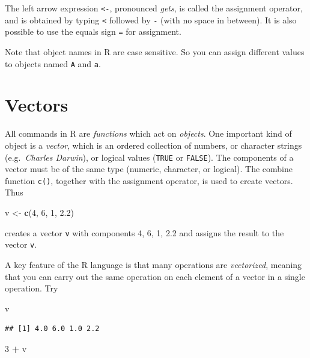 \documentclass[
]{book}
\newenvironment{Shaded}{\begin{snugshade}}{\end{snugshade}}
\newcommand{\DecValTok}[1]{\textcolor[rgb]{0.00,0.00,0.81}{#1}}
\newcommand{\FloatTok}[1]{\textcolor[rgb]{0.00,0.00,0.81}{#1}}
\newcommand{\FunctionTok}[1]{\textcolor[rgb]{0.13,0.29,0.53}{\textbf{#1}}}
\newcommand{\NormalTok}[1]{#1}
\newcommand{\OtherTok}[1]{\textcolor[rgb]{0.56,0.35,0.01}{#1}}
\newcommand{\SpecialCharTok}[1]{\textcolor[rgb]{0.81,0.36,0.00}{\textbf{#1}}}
\begin{document}
The left arrow expression \texttt{\textless{}-}, pronounced \emph{gets}, is called
the assignment operator, and is obtained by typing \texttt{\textless{}} followed
by \texttt{-} (with no space in between). It is also possible to use
the equals sign \texttt{=} for assignment.

Note that object names in R are case sensitive. So you can assign
different values to objects named \texttt{A} and \texttt{a}.

\section{Vectors}\label{vectors}

All commands in R are \emph{functions} which act on \emph{objects}. One
important kind of object is a \emph{vector}, which is an ordered
collection of numbers, or character strings (e.g.~\emph{Charles Darwin}),
or logical values (\texttt{TRUE} or \texttt{FALSE}). The components of a
vector must be of the same type (numeric, character, or logical). The
combine function \texttt{c()}, together with the assignment operator, is
used to create vectors. Thus

\begin{Shaded}
\begin{Highlighting}[]
\NormalTok{v }\OtherTok{\textless{}{-}} \FunctionTok{c}\NormalTok{(}\DecValTok{4}\NormalTok{, }\DecValTok{6}\NormalTok{, }\DecValTok{1}\NormalTok{, }\FloatTok{2.2}\NormalTok{)}
\end{Highlighting}
\end{Shaded}

creates a vector \texttt{v} with components 4, 6, 1, 2.2 and assigns the
result to the vector \texttt{v}.

A key feature of the R language is that many operations are \emph{vectorized},
meaning that you can carry out the same operation on
each element of a vector in a single operation. Try

\begin{Shaded}
\begin{Highlighting}[]
\NormalTok{v}
\end{Highlighting}
\end{Shaded}

\begin{verbatim}
## [1] 4.0 6.0 1.0 2.2
\end{verbatim}

\begin{Shaded}
\begin{Highlighting}[]
\DecValTok{3} \SpecialCharTok{+}\NormalTok{ v}
\end{Highlighting}
\end{Shaded}
\end{document}
